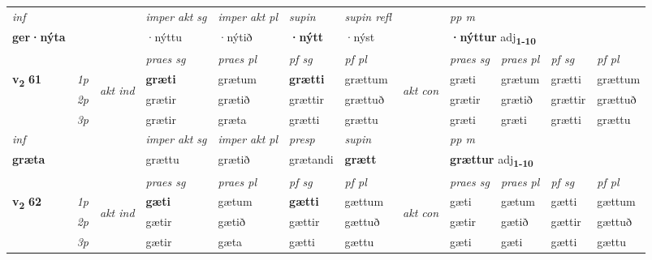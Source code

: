 \begin{longtable}[l]{X>{\footnotesize\itshape}llXXXXlXXXX}
   {\textit{inf}} & &  & \textit{imper akt sg} & \textit{imper akt pl}    & \textit{supin} & \textit{supin refl} && \textit{pp m} \\*
  {\textbf{ger\allowbreak ·nýta}} & && ·nýttu  & ·nýtið    &  \textbf{·nýtt} & ·nýst && \multicolumn{2}{l}{\textbf{·nýttur} adj\textbf{\textsubscript{1-10}}} \\*

\midrule

 & &   & \textit{praes sg}  & \textit{praes pl}    & \textit{ pf sg} & \textit{pf pl} & & \textit{praes sg}  & \textit{praes pl}    & \textit{pf sg} & \textit{pf pl }  \\ \cmidrule{4-7} \cmidrule{9-12}
 \multirow{2}{*}{{{\textbf{v{\textsubscript{2}}} \Large{\textbf{61}}}}}  & 1p & \multirow{3}{*}{\begin{turn}{90}\textit{akt ind}\end{turn}} & \textbf{græti} & grætum & \textbf{grætti} & grættum & \multirow{3}{*}{\begin{turn}{90}\textit{akt con}\end{turn}} &græti & grætum & grætti & grættum\\*
 & 2p &  &  grætir  & grætið & grættir & grættuð & & grætir & grætið & grættir & grættuð \\*
 & 3p &  & grætir & græta & grætti & grættu & & græti & græti& grætti & grættu \\*
\cmidrule{4-7} \cmidrule{9-12}

   {\textit{inf}} & &  & \textit{imper akt sg} & \textit{imper akt pl}   & \textit{presp} & \textit{supin}  && \textit{pp m} \\*
  {\textbf{græta}} & && grættu  & grætið   & grætandi &  \textbf{grætt}  && \multicolumn{2}{l}{\textbf{grættur} adj\textbf{\textsubscript{1-10}}} \\*

\midrule

\midrule
 & &   & \textit{praes sg}  & \textit{praes pl}    & \textit{ pf sg} & \textit{pf pl} & & \textit{praes sg}  & \textit{praes pl}    & \textit{pf sg} & \textit{pf pl }  \\ \cmidrule{4-7} \cmidrule{9-12}
 \multirow{2}{*}{{{\textbf{v{\textsubscript{2}}} \Large{\textbf{62}}}}}  & 1p & \multirow{3}{*}{\begin{turn}{90}\textit{akt ind}\end{turn}} & \textbf{gæti} & gætum & \textbf{gætti} & gættum & \multirow{3}{*}{\begin{turn}{90}\textit{akt con}\end{turn}} &gæti & gætum & gætti & gættum\\*
 & 2p &  &  gætir  & gætið & gættir & gættuð & & gætir & gætið & gættir & gættuð \\*
 & 3p &  & gætir & gæta & gætti & gættu & & gæti & gæti& gætti & gættu \\*
\cmidrule{4-7} \cmidrule{9-12}


\end{longtable}
